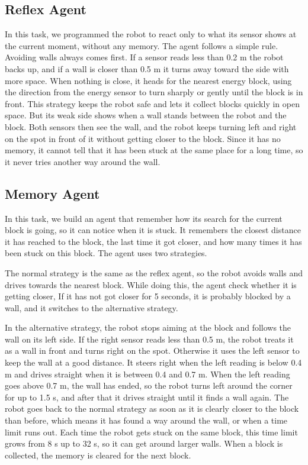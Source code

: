 \documentclass{article}
\begin{document}
\subsection*{Reflex Agent}
In this task, we programmed the robot to react only to what its sensor shows at the current moment, without any memory. The agent follows a simple rule. Avoiding walls always comes first. If a sensor reads less than 0.2 m the robot backs up, and if a wall is closer than 0.5 m it turns away toward the side with more space. When nothing is close, it heads for the nearest energy block, using the direction from the energy sensor to turn sharply or gently until the block is in front. This strategy keeps the robot safe and lets it collect blocks quickly in open space. But its weak side shows when a wall stands between the robot and the block. Both sensors then see the wall, and the robot keeps turning left and right on the spot in front of it without getting closer to the block. Since it has no memory, it cannot tell that it has been stuck at the same place for a long time, so it never tries another way around the wall.


\subsection*{Memory Agent}
In this task, we build an agent that remember how its search for the current block is going, so it can notice when it is stuck. It remembers the closest distance it has reached to the block, the last time it got closer, and how many times it has been stuck on this block. The agent uses two strategies.

\medskip
The normal strategy is the same as the reflex agent, so the robot avoids walls and drives towards the nearest block. While doing this, the agent check whether it is getting closer, If it has not got closer for 5 seconds, it is probably blocked by a wall, and it switches to the alternative strategy. 

\medskip
In the alternative strategy, the robot stops aiming at the block and follows the wall on its left side. If the right sensor reads less than 0.5 m, the robot treats it as a wall in front and turns right on the spot. Otherwise it uses the left sensor to keep the wall at a good distance. It steers right when the left reading is below 0.4 m and drives straight when it is between 0.4 and 0.7 m. When the left reading goes above 0.7 m, the wall has ended, so the robot turns left around the corner for up to 1.5 s, and after that it drives straight until it finds a wall again. The robot goes back to the normal strategy as soon as it is clearly closer to the block than before, which means it has found a way around the wall, or when a time limit runs out. Each time the robot gets stuck on the same block, this time limit grows from 8 s up to 32 s, so it can get around larger walls. When a block is collected, the memory is cleared for the next block.
\end{document}
